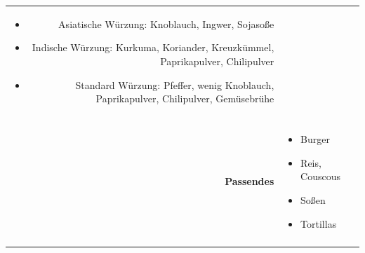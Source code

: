 \documentclass[a4paper, 12pt]{scrbook} 								%
\numberwithin{equation}{section} 									%
\begin{document}
\begin{tabularx}{\textwidth}{r|L}
\begin{itemize}[nosep]
										\item Asiatische Würzung: Knoblauch, Ingwer, Sojasoße
										\item Indische Würzung: Kurkuma, Koriander, Kreuzkümmel, Paprikapulver, Chilipulver
										\item Standard Würzung: Pfeffer, wenig Knoblauch, Paprikapulver, Chilipulver, Gemüsebrühe
									\end{itemize}	\\
								&	\\	
		\textbf{Passendes}		&	\begin{itemize}[nosep]
										\item Burger
										\item Reis, Couscous
										\item Soßen
										\item Tortillas
									\end{itemize}	\\
								&	\\	
	\end{tabularx}
\end{document}
